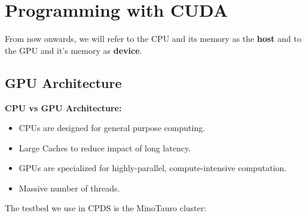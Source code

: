 \section{Programming with CUDA}

From now onwards, we will refer to the CPU and its memory as the \textbf{host} and to the GPU and it's memory as \textbf{device}.

\subsection{GPU Architecture}
\textbf{CPU vs GPU Architecture:}
\begin{multicols}{2}
    \begin{itemize}
        \item  CPUs are designed for general purpose computing.
        \item Large Caches to reduce impact of long latency.
        \item GPUs are specialized for highly-parallel, compute-intensive computation.
        \item Massive number of threads.
    \end{itemize}
\end{multicols}
The testbed we use in CPDS is the MinoTauro cluster:
